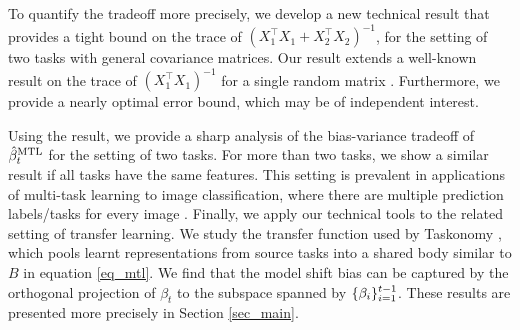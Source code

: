 To quantify the tradeoff more precisely, we develop a new technical result that provides a tight bound on the trace of $(X_1^{\top}X_1 + X_2^{\top}X_2)^{-1}$, for the setting of two tasks with general covariance matrices.
Our result extends a well-known result on the trace of $(X_1^{\top}X_1)^{-1}$ for a single random matrix \cite{S07}.
Furthermore, we provide a nearly optimal error bound, which may be of independent interest.

Using the result, we provide a sharp analysis of the bias-variance tradeoff of $\hat{\beta}_t^{\text{MTL}}$ for the setting of two tasks.
For more than two tasks, we show a similar result if all tasks have the same features.
This setting is prevalent in applications of multi-task learning to image classification, where there are multiple prediction labels/tasks for every image \cite{chexnet17,EA20}.
Finally, we apply our technical tools to the related setting of transfer learning.
We study the transfer function used by Taskonomy \cite{ZSSGM18}, which pools learnt representations from source tasks into a shared body similar to $B$ in equation \eqref{eq_mtl}.
We find that the model shift bias can be captured by the orthogonal projection of $\beta_t$ to the subspace spanned by $\{\beta_i\}_{i=1}^{t-1}$.
These results are presented more precisely in Section \ref{sec_main}.

